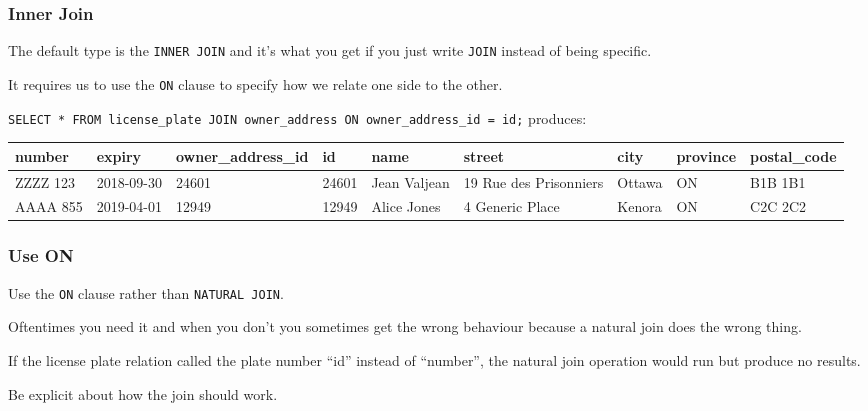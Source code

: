 \begin{frame}
\frametitle{Inner Join}

The default type is the \texttt{INNER JOIN} and it's what you get if you just write \texttt{JOIN} instead of being specific. 

It requires us to use the \texttt{ON} clause to specify how we relate one side to the other.

\texttt{SELECT * FROM license\_plate JOIN owner\_address ON owner\_address\_id = id;} produces:

{\tiny
\begin{center}
	\begin{tabular}{|l|l|l|l|l|l|l|l|l|}\hline
		\textbf{number} & \textbf{expiry} & \textbf{owner\_address\_id} & \textbf{id} & \textbf{name} &\textbf{street} & \textbf{city} & \textbf{province} & \textbf{postal\_code} \\ \hline
		ZZZZ 123 & 2018-09-30 & 24601 & 24601 & Jean Valjean & 19 Rue des Prisonniers & Ottawa & ON & B1B 1B1\\ \hline
		AAAA 855 & 2019-04-01 & 12949 & 12949 & Alice Jones & 4 Generic Place & Kenora & ON & C2C 2C2\\ \hline
	\end{tabular}
\end{center}
}

\end{frame}



\begin{frame}
\frametitle{Use ON}

Use the \texttt{ON} clause rather than \texttt{NATURAL JOIN}. 

Oftentimes you need it and when you don't you sometimes get the wrong behaviour because a natural join does the wrong thing. 

If the license plate relation called the plate number ``id'' instead of ``number'', the natural join operation would run but produce no results. 

Be explicit about how the join should work.


\end{frame}



